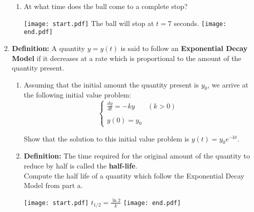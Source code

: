 \documentclass[12pt]{article}
\begin{document}
\begin{enumerate}
\begin{enumerate}
\item At what time does the ball come to a complete stop?

\texttt{[image: start.pdf]}
{{The ball will stop at $t=7$ seconds.}}
\texttt{[image: end.pdf]}


\end{enumerate}

\item {\bf Definition:} A quantity $y=y(t)$ is said to follow an {\bf Exponential Decay Model} if it decreases at a rate which is proportional to the amount of the quantity present.

\begin{enumerate}

\item Assuming that the initial amount the quantity present is $y_0$, we arrive at the following initial value problem: $$\left\{\begin{array}{ll} \frac{dy}{dt}=-ky & (k>0)\\
 & \\
y(0)=y_0& \end{array}\right.$$

Show that the solution to this initial value problem is $y(t)=y_0e^{-kt}$.

\item {\bf Definition:} The time required for the original amount of the quantity to reduce by half is called the {\bf half-life}.\\

Compute the half life of a quantity which follow the Exponential Decay Model from part a.

\texttt{[image: start.pdf]}
{{$t_{1/2}=\frac{\ln{2}}{k}$}}
\texttt{[image: end.pdf]}


\end{enumerate}

\end{enumerate}

\newpage

\end{document}
